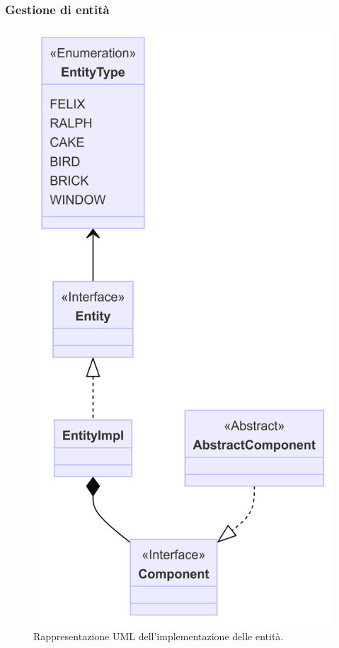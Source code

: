 \documentclass[a4paper,12pt]{report}
\begin{document}
\subsubsection{Gestione di entità}

\begin{figure}[H]
\centering{}
\includegraphics[width=\textwidth]{img/entities.png}
\caption{Rappresentazione UML dell'implementazione delle entità.}
\end{figure}
\end{document}
